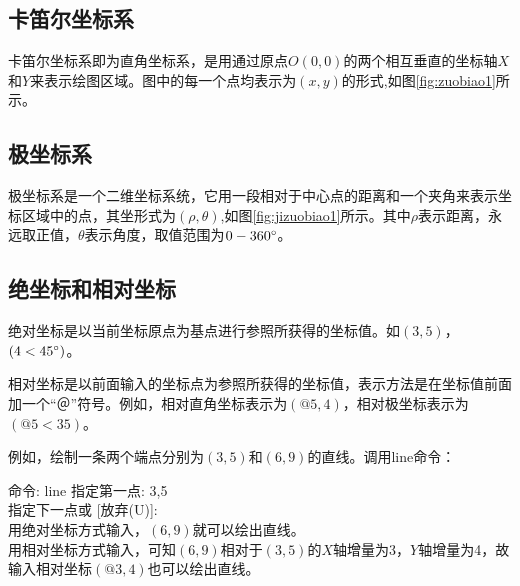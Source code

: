 \subsection{卡笛尔坐标系}
卡笛尔坐标系即为直角坐标系，是用通过原点$O(0,0)$的两个相互垂直的坐标轴$X$和$Y$来表示绘图区域。图中的每一个点均表示为$(x,y)$的形式,如图\ref{fig:zuobiao1}所示。
\begin{figure}[htbp]
\centering
\begin{floatrow}
\end{floatrow}
\end{figure}
\subsection{极坐标系}
极坐标系是一个二维坐标系统，它用一段相对于中心点的距离和一个夹角来表示坐标区域中的点，其坐形式为$(\rho,\theta)$,如图\ref{fig:jizuobiao1}所示。其中$\rho$表示距离，永远取正值，$\theta$表示角度，取值范围为$0-360\degree$。
\subsection{绝坐标和相对坐标}
绝对坐标是以当前坐标原点为基点进行参照所获得的坐标值。如$(3,5)$，$(4<45\degree)$。

相对坐标是以前面输入的坐标点为参照所获得的坐标值，表示方法是在坐标值前面加一个“＠”符号。例如，相对直角坐标表示为$(@5,4)$，相对极坐标表示为$(@5<35)$。

例如，绘制一条两个端点分别为$(3,5)$和$(6,9)$的直线。调用line命令：

\noindent
命令: line 指定第一点: 3,5\\
指定下一点或 [放弃(U)]:\\
用绝对坐标方式输入，$(6,9)$就可以绘出直线。\\
用相对坐标方式输入，可知$(6,9)$相对于$(3,5)$的$X$轴增量为3，$Y$轴增量为4，故输入相对坐标$(@3,4)$也可以绘出直线。

